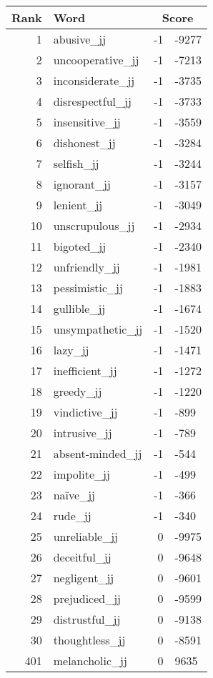 \begin{longtable}[!htbp]{| rlr@{.}l |}
    \hline
    \textbf{Rank} & \textbf{Word} & \multicolumn{2}{c|}{\textbf{Score}} \\
    \hline
    \endhead
    1 & abusive\_jj & -1 & -9277 \\
    2 & uncooperative\_jj & -1 & -7213 \\
    3 & inconsiderate\_jj & -1 & -3735 \\
    4 & disrespectful\_jj & -1 & -3733 \\
    5 & insensitive\_jj & -1 & -3559 \\
    6 & dishonest\_jj & -1 & -3284 \\
    7 & selfish\_jj & -1 & -3244 \\
    8 & ignorant\_jj & -1 & -3157 \\
    9 & lenient\_jj & -1 & -3049 \\
    10 & unscrupulous\_jj & -1 & -2934 \\
    11 & bigoted\_jj & -1 & -2340 \\
    12 & unfriendly\_jj & -1 & -1981 \\
    13 & pessimistic\_jj & -1 & -1883 \\
    14 & gullible\_jj & -1 & -1674 \\
    15 & unsympathetic\_jj & -1 & -1520 \\
    16 & lazy\_jj & -1 & -1471 \\
    17 & inefficient\_jj & -1 & -1272 \\
    18 & greedy\_jj & -1 & -1220 \\
    19 & vindictive\_jj & -1 & -899 \\
    20 & intrusive\_jj & -1 & -789 \\
    21 & absent-minded\_jj & -1 & -544 \\
    22 & impolite\_jj & -1 & -499 \\
    23 & naïve\_jj & -1 & -366 \\
    24 & rude\_jj & -1 & -340 \\
    25 & unreliable\_jj & 0 & -9975 \\
    26 & deceitful\_jj & 0 & -9648 \\
    27 & negligent\_jj & 0 & -9601 \\
    28 & prejudiced\_jj & 0 & -9599 \\
    29 & distrustful\_jj & 0 & -9138 \\
    30 & thoughtless\_jj & 0 & -8591 \\
    401 & melancholic\_jj & 0 & 9635 \\

\end{longtable}
